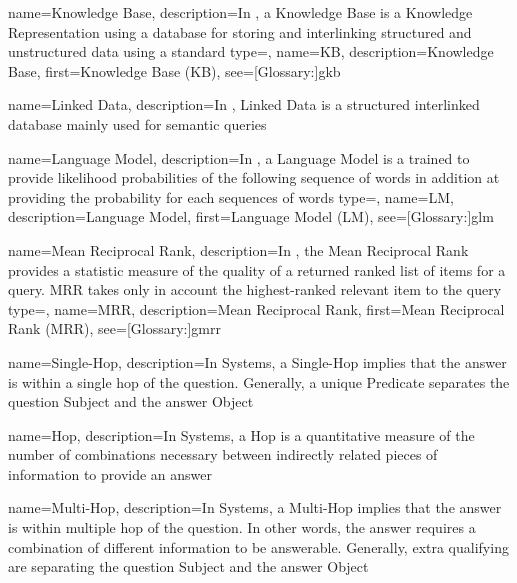 {
  name={Knowledge Base},
  description={In , a Knowledge Base is a Knowledge Representation using a  database for storing and interlinking structured and unstructured data using a standard}
}
{
  type=\acronymtype,
  name={KB},
  description={Knowledge Base},
  first={Knowledge Base (KB)},
  see=[Glossary:]{gkb}
}


{
  name={Linked Data},
  description={In , Linked Data is a structured interlinked database mainly used for semantic queries}
}

{
  name={Language Model},
  description={In , a Language Model is a  trained to provide likelihood probabilities of the following sequence of words in addition at providing the probability for each sequences of words}
}
{
  type=\acronymtype,
  name={LM},
  description={Language Model},
  first={Language Model (LM)},
  see=[Glossary:]{glm}
}

{
  name={Mean Reciprocal Rank},
  description={In , the Mean Reciprocal Rank provides a statistic measure of the quality of a returned ranked list of items for a query. MRR takes only in account the highest-ranked relevant item to the query}
}
{
  type=\acronymtype,
  name={MRR},
  description={Mean Reciprocal Rank},
  first={Mean Reciprocal Rank (MRR)},
  see=[Glossary:]{gmrr}
}


{
  name={Single-Hop},
  description={In  Systems, a Single-Hop implies that the answer is within a single \gls{hop} of the question. Generally, a unique Predicate separates the question Subject and the answer Object}
}

{
  name={Hop},
  description={In  Systems, a Hop is a quantitative measure of the number of combinations necessary between indirectly related pieces of information to provide an answer}
}


{
  name={Multi-Hop},
  description={In  Systems, a Multi-Hop implies that the answer is within multiple \gls{hop} of the question. In other words, the answer requires a combination of different information to be answerable. Generally, extra qualifying  are separating the question Subject and the answer Object}
}

